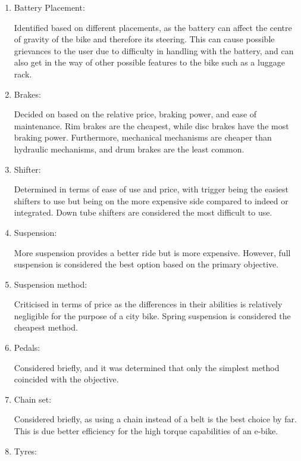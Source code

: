 \documentclass[a4paper,11pt]{article}
\begin{document}
\begin{enumerate}[leftmargin=0pt, itemindent=20pt,labelwidth=15pt, labelsep=5pt, listparindent=0.7cm,align=left]
	\item Battery Placement:

Identified based on different placements, as the battery can affect the centre of gravity of the bike and therefore its steering. This can cause possible grievances to the user due to difficulty in handling with the battery, and can also get in the way of other possible features to the bike such as a luggage rack.

	\item Brakes:

Decided on based on the relative price, braking power, and ease of maintenance. Rim brakes are the cheapest, while disc brakes have the most braking power. Furthermore, mechanical mechanisms are cheaper than hydraulic mechanisms, and drum brakes are the least common.

	\item Shifter:

Determined in terms of ease of use and price, with trigger being the easiest shifters to use but being on the more expensive side compared to indeed or integrated. Down tube shifters are considered the most difficult to use.

	\item Suspension:

More suspension provides a better ride but is more expensive. However, full suspension is considered the best option based on the primary objective.

	\item Suspension method:

Criticised in terms of price as the differences in their abilities is relatively negligible for the purpose of a city bike. Spring suspension is considered the cheapest method.

	\item Pedals:

Considered briefly, and it was determined that only the simplest method coincided with the objective.

	\item Chain set:

Considered briefly, as using a chain instead of a belt is the best choice by far. This is due better efficiency for the high torque capabilities of an e-bike.

	\item Tyres:


\end{enumerate}
\end{document}
